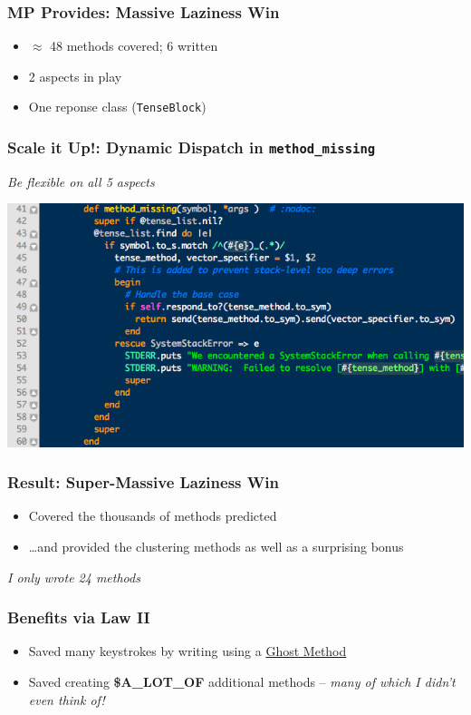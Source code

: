 \documentclass[slidestop,compress,mathserif]{beamer}
\begin{document}
\begin{frame}
	\frametitle{MP Provides:  Massive Laziness Win}
	\begin{itemize}
		\item $\approx$ 48 methods covered; 6 written
		\pause
		\item 2 aspects in play
		\pause
		\item One reponse class (\texttt{TenseBlock})
	\end{itemize}
\end{frame}

\begin{frame}
	\frametitle{Scale it Up!: Dynamic Dispatch in \texttt{method\_missing}}
	\begin{center}
		\emph{Be flexible on all 5 aspects}
	\end{center}
	\includegraphics[scale=0.45]{img/lv_mm.png}	
\end{frame}

\begin{frame}
	\frametitle{Result:  Super-Massive Laziness Win}
	\begin{itemize}
		\item Covered the thousands of methods predicted
		\pause
		\item \ldots and provided the clustering methods as well as a surprising bonus
	\end{itemize}
	\pause
	\vskip 0.5cm
	\emph{I only wrote 24 methods}
\end{frame}

\begin{frame}
	\frametitle{Benefits via Law II}
	\begin{itemize}
		\item Saved many keystrokes by writing using a \underline{Ghost Method}
		\pause
		\item Saved creating \textbf{\$A\_LOT\_OF} additional methods -- \emph{many of which I didn't even think of!}
	\end{itemize}
\end{frame}
\end{document}
